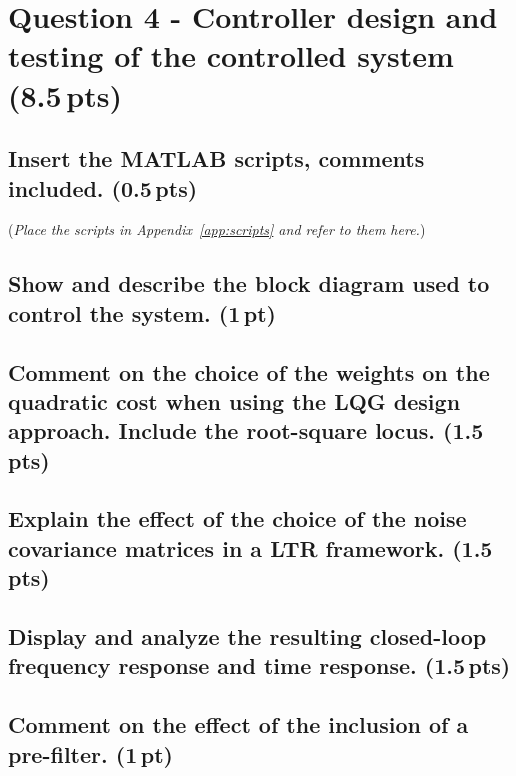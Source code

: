 \documentclass[a4paper,12pt]{article}
\begin{document}
\section{Question 4 - Controller design and testing of the controlled system (8.5\,pts)}
\label{sec:q4}

\subsection{Insert the MATLAB scripts, comments included. (0.5\,pts)}
(\textit{Place the scripts in Appendix~\ref{app:scripts} and refer to them here.})
\vspace{10pt}


\subsection{Show and describe the block diagram used to control the system. (1\,pt)}
\vspace{10pt}


\subsection{Comment on the choice of the weights on the quadratic cost when using the LQG design approach. Include the root-square locus. (1.5\,pts)}
\vspace{10pt}


\subsection{Explain the effect of the choice of the noise covariance matrices in a LTR framework. (1.5\,pts)}
\vspace{10pt}


\subsection{Display and analyze the resulting closed-loop frequency response and time response. (1.5\,pts)}
\vspace{10pt}


\subsection{Comment on the effect of the inclusion of a pre-filter. (1\,pt)}
\vspace{10pt}
\end{document}
